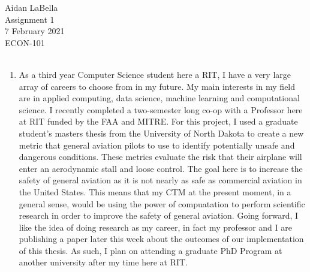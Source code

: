 \documentclass[12pt]{article}
\begin{document}
\noindent
Aidan LaBella \\
Assignment 1 \\ 
7 February 2021\\
ECON-101 \\
\\
\begin{enumerate}
\item
\indent
As a third year Computer Science student here a RIT, I have a very large array of careers to choose from in my future. My main interests in my field are in applied computing, data science, machine learning and computational science. I recently completed a two-semester long co-op with a Professor here at RIT funded by the FAA and MITRE. For this project, I used a graduate student's masters thesis from the University of North Dakota to create a new metric that general aviation pilots to use to identify potentially unsafe and dangerous conditions. These metrics evaluate the risk that their airplane will enter an aerodynamic stall and loose control. The goal here is to increase the safety of general aviation as it is not nearly as safe as commercial aviation in the United States. This means that my CTM at the present moment, in a general sense, would be using the power of compuatation to perform scientific research in order to improve the safety of general aviation. Going forward, I like the idea of doing research as my career, in fact my professor and I are publishing a paper later this week about the outcomes of our implementation of this thesis. As such, I plan on attending a graduate PhD Program at another university after my time here at RIT. \\ 


\end{enumerate}
\end{document}

